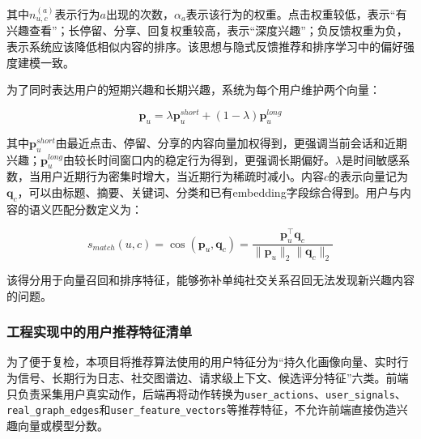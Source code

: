 其中$n_{u,c}^{(a)}$表示行为$a$出现的次数，$\alpha_a$表示该行为的权重。点击权重较低，表示“有兴趣查看”；长停留、分享、回复权重较高，表示“深度兴趣”；负反馈权重为负，表示系统应该降低相似内容的排序。该思想与隐式反馈推荐和排序学习中的偏好强度建模一致\cite{hu2008collaborative,rendle2009bpr}。

为了同时表达用户的短期兴趣和长期兴趣，系统为每个用户维护两个向量：

\[
  \mathbf{p}_u = \lambda \mathbf{p}_u^{short} + (1-\lambda)\mathbf{p}_u^{long}
\]

其中$\mathbf{p}_u^{short}$由最近点击、停留、分享的内容向量加权得到，更强调当前会话和近期兴趣；$\mathbf{p}_u^{long}$由较长时间窗口内的稳定行为得到，更强调长期偏好。$\lambda$是时间敏感系数，当用户近期行为密集时增大，当近期行为稀疏时减小。内容$c$的表示向量记为$\mathbf{q}_c$，可以由标题、摘要、关键词、分类和已有embedding字段综合得到。用户与内容的语义匹配分数定义为：

\[
  s_{match}(u,c)=\cos(\mathbf{p}_u,\mathbf{q}_c)=
  \frac{\mathbf{p}_u^\top \mathbf{q}_c}{\|\mathbf{p}_u\|_2\|\mathbf{q}_c\|_2}
\]

该得分用于向量召回和排序特征，能够弥补单纯社交关系召回无法发现新兴趣内容的问题。

\subsubsection{工程实现中的用户推荐特征清单}

为了便于复检，本项目将推荐算法使用的用户特征分为“持久化画像向量、实时行为信号、长期行为日志、社交图谱边、请求级上下文、候选评分特征”六类。前端只负责采集用户真实动作，后端再将动作转换为\texttt{user\_actions}、\texttt{user\_signals}、\texttt{real\_graph\_edges}和\texttt{user\_feature\_vectors}等推荐特征，不允许前端直接伪造兴趣向量或模型分数。

